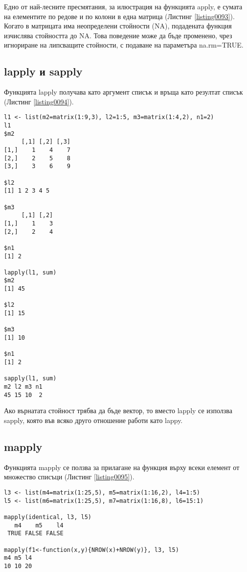 Едно от най-лесните пресмятания, за илюстрация на функцията apply, е сумата на елементите по редове и по колони в една матрица (Листинг \ref{listing0093}). Когато в матрицата има неопределени стойности (NA), подадената функция изчислява стойността до NA. Това поведение може да бъде променено, чрез игнориране на липсващите стойности, с подаване на параметъра na.rm=TRUE.

\subsection{lapply и sapply}

Функцията lapply получава като аргумент списък и връща като резултат списък (Листинг \ref{listing0094}). 

\begin{lstlisting}[caption=Сума на обекти в списък, label=listing0094]
l1 <- list(m2=matrix(1:9,3), l2=1:5, m3=matrix(1:4,2), n1=2)
l1
$m2
     [,1] [,2] [,3]
[1,]    1    4    7
[2,]    2    5    8
[3,]    3    6    9

$l2
[1] 1 2 3 4 5

$m3
     [,1] [,2]
[1,]    1    3
[2,]    2    4

$n1
[1] 2

lapply(l1, sum)
$m2
[1] 45

$l2
[1] 15

$m3
[1] 10

$n1
[1] 2

sapply(l1, sum)
m2 l2 m3 n1 
45 15 10  2
\end{lstlisting}

Ако върнатата стойност трябва да бъде вектор, то вместо lapply се използва sapply, която във всяко друго отношение работи като lappy.

\subsection{mapply}

Функцията mapply се ползва за прилагане на функция върху всеки елемент от множество списъци (Листинг \ref{listing0095}). 
\begin{lstlisting}[caption=Проверка за идентичност на елементите, label=listing0095]
l3 <- list(m4=matrix(1:25,5), m5=matrix(1:16,2), l4=1:5)
l5 <- list(m6=matrix(1:25,5), m7=matrix(1:16,8), l6=15:1)

mapply(identical, l3, l5)
   m4    m5    l4 
 TRUE FALSE FALSE

mapply(f1<-function(x,y){NROW(x)+NROW(y)}, l3, l5)
m4 m5 l4 
10 10 20 
\end{lstlisting}

